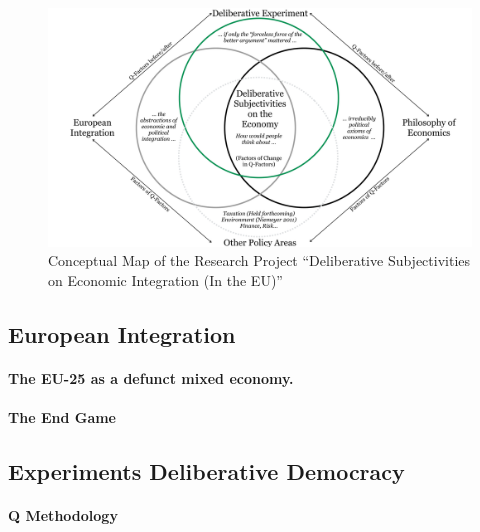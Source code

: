 \documentclass[11pt,a4paper,oneside,english]{article}
\begin{document}
\begin{landscape}
 \begin{figure}[htbp]
    \begin{center}
	\includegraphics[width=1\linewidth]{img/deliberative-subjectivities}
	\caption{Conceptual Map of the Research Project ``Deliberative Subjectivities on Economic Integration (In the EU)''}
	\label{fig:deliberative-subjectivities}
	\end{center}
\end{figure}
\end{landscape}

\subsection[European Integration]{European Integration} \label{sec:european-integration}

\paragraph{The EU-25 as a defunct mixed economy.}

\paragraph{The End Game}

\subsection[Deliberative Experiments]{Experiments Deliberative Democracy} \label{sec:deliberative-experiments}

\paragraph{Q Methodology}
\end{document}
